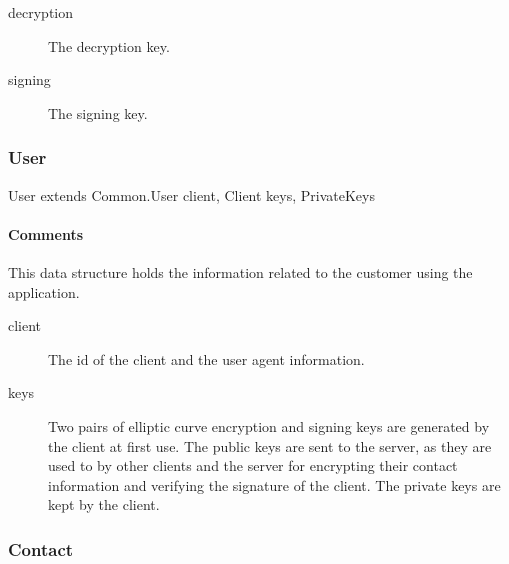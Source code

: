 \documentclass[a4paper,10pt]{article}
\begin{document}
\begin{inparaitem}[ ]
 \item \infrastructure
\end{inparaitem}

\SpecialItem
\begin{description}
 \item[decryption] The decryption key.
 \item[signing] The signing key.
\end{description}

\subsubsection{User}

\begin{verbbox}
User extends Common.User
{
  client, Client
  keys, PrivateKeys
}
\end{verbbox}
\begin{center}
\theverbbox
\end{center}

\begin{inparaitem}[ ]
 \item \unique
 \item \secure
 \item \persistent
\end{inparaitem}

\paragraph*{Comments}
This data structure holds the information related to the customer using the application.

\SpecialItem
\begin{description}
 \item[client] The id of the client and the user agent information.
 \item[keys] Two pairs of elliptic curve encryption and signing keys are generated by the client at first use. The public keys are sent to the server, as they are used to by other 
clients and the server for encrypting their contact information and verifying the signature of the client. The private keys are kept by the client.
\end{description}

\subsubsection{Contact}
\label{sec:structure:client:contact}
\end{document}
